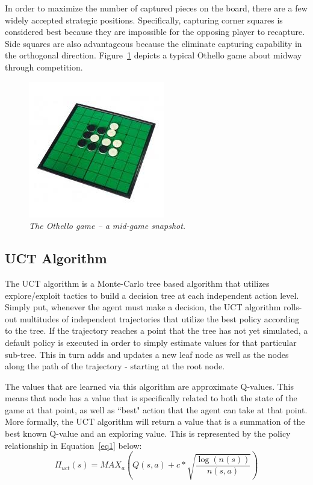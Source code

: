 \documentclass[12pt,letterpaper]{article}
\begin{document}
In order to maximize the number of captured pieces on the board, there are a few widely accepted strategic positions.  Specifically, capturing corner squares is considered best because they are impossible for the opposing player to recapture. Side squares are also advantageous because the eliminate capturing capability in the orthogonal direction. Figure~\ref{fig1} depicts a typical Othello game about midway through competition.

\begin{figure}[!h]
\begin{center}
\includegraphics[scale=1]{othello_board}
\caption{\textit{The Othello game -- a mid-game snapshot.}}
\label{fig1}
\end{center}
\end{figure}

\pagebreak
\subsection{UCT Algorithm}
The UCT algorithm is a Monte-Carlo tree based algorithm that utilizes explore/exploit tactics to build a decision tree at each independent action level. Simply put, whenever the agent must make a decision, the UCT algorithm rolls-out multitudes of independent trajectories that utilize the best policy according to the tree. If the trajectory reaches a point that the tree has not yet simulated, a default policy is executed in order to simply estimate values for that particular sub-tree.  This in turn adds and updates a new leaf node as well as the nodes along the path of the trajectory - starting at the root node.

The values that are learned via this algorithm are approximate Q-values.  This means that node has a value that is specifically related to both the state of the game at that point, as well as ``best" action that the agent can take at that point. More formally, the UCT algorithm will return a value that is a summation of the best known Q-value and an exploring value.  This is represented by the policy relationship in Equation~\ref{eq1} below:
\begin{equation}
\label{eq1}
\Pi_{uct}(s) = MAX_a \left( Q(s,a) + c*\sqrt{\frac{\log(n(s))}{n(s,a)}} \right)
\end{equation}
\end{document}
